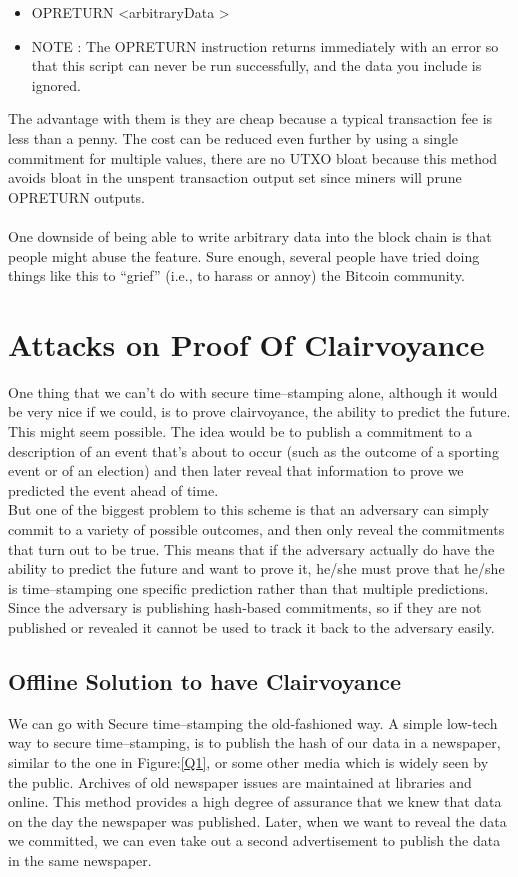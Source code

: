 \documentclass[10pt,a4paper]{article}
\begin{document}
\begin{itemize}
    \item \textit{} OP\textunderscore RETURN \textless arbitraryData \textgreater
    \item \textit{} NOTE : The OP\textunderscore RETURN instruction returns immediately with an error so that this script can never be run successfully, and the data you include is ignored. 
\end{itemize}

The advantage with them is they are cheap because a typical transaction fee is less than a penny. The cost can be reduced even further by using a single commitment for multiple values, there are no UTXO bloat because this method avoids bloat in the unspent transaction output set since miners will prune OP\textunderscore RETURN outputs.
\\
\\
One downside of being able to write arbitrary data into the block chain is that people might abuse the feature. Sure enough, several people have tried doing things like this to “grief” (i.e., to harass or annoy) the Bitcoin community.

\section{Attacks on Proof Of Clairvoyance}
One thing that we can’t do with secure time--stamping alone, although it would be very nice if we could, is to prove clairvoyance, the ability to predict the future. This might seem possible. The idea would be to publish a commitment to a description of an event that’s about to occur (such as the outcome of a sporting event or of an election) and then later reveal that information to prove we predicted the event ahead of time.
\\

But one of the biggest problem to this scheme is that an adversary can simply commit to a variety of possible outcomes, and then only reveal the commitments that turn out to be true. This means that if the adversary actually do have the ability to predict the future and want to prove it, he/she must prove that he/she is time--stamping one specific prediction rather than that multiple predictions. Since the adversary is publishing hash-based commitments, so if they are not published or revealed it cannot be used to track it back to the adversary easily.

\subsection{Offline Solution to have Clairvoyance}
We can go with Secure time--stamping the old-fashioned way. A simple low-tech way to secure time--stamping, is to publish the hash of our data in a newspaper, similar to the one in Figure:\ref{Q1}, or some other media which is widely seen by the public. Archives of old newspaper issues are maintained at libraries and online. This method provides a high degree of assurance that we knew that data on the day the newspaper was published. Later, when we want to reveal the data we committed, we can even take out a second advertisement to publish the data in the same newspaper.
\end{document}
